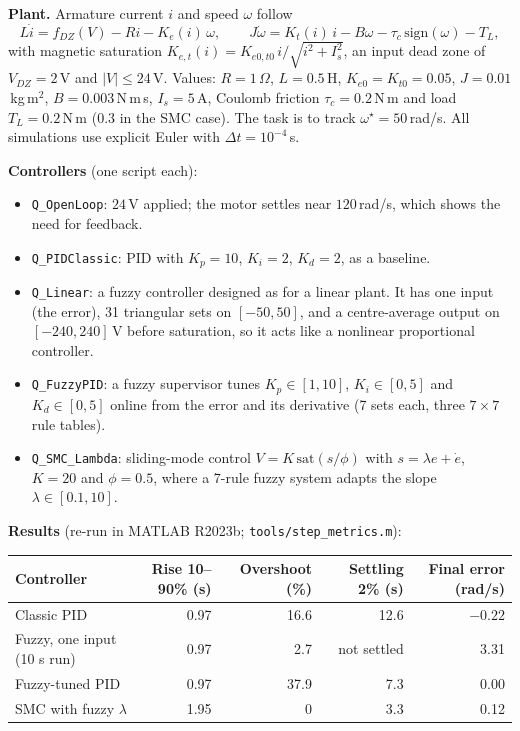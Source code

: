 


\textbf{Plant.} Armature current $i$ and speed $\omega$ follow
\[ L\dot i=f_{DZ}(V)-Ri-K_e(i)\,\omega,\qquad J\dot\omega=K_t(i)\,i-B\omega-\tau_c\,\mathrm{sign}(\omega)-T_L, \]
with magnetic saturation $K_{e,t}(i)=K_{e0,t0}\,i/\sqrt{i^2+I_s^2}$, an input dead zone of $V_{DZ}=2$\,V and $|V|\le24$\,V. Values: $R=1\,\Omega$, $L=0.5$\,H, $K_{e0}=K_{t0}=0.05$, $J=0.01$\,kg\,m$^2$, $B=0.003$\,N\,m\,s, $I_s=5$\,A, Coulomb friction $\tau_c=0.2$\,N\,m and load $T_L=0.2$\,N\,m ($0.3$ in the SMC case). The task is to track $\omega^\star=50$\,rad/s. All simulations use explicit Euler with $\Delta t=10^{-4}$\,s.

\textbf{Controllers} (one script each):
\begin{itemize}
  \item \texttt{Q\_OpenLoop}: $24$\,V applied; the motor settles near $120$\,rad/s, which shows the need for feedback.
  \item \texttt{Q\_PIDClassic}: PID with $K_p=10$, $K_i=2$, $K_d=2$, as a baseline.
  \item \texttt{Q\_Linear}: a fuzzy controller designed as for a linear plant. It has one input (the error), 31 triangular sets on $[-50,50]$, and a centre-average output on $[-240,240]$\,V before saturation, so it acts like a nonlinear proportional controller.
  \item \texttt{Q\_FuzzyPID}: a fuzzy supervisor tunes $K_p\in[1,10]$, $K_i\in[0,5]$ and $K_d\in[0,5]$ online from the error and its derivative (7 sets each, three $7\times7$ rule tables).
  \item \texttt{Q\_SMC\_Lambda}: sliding-mode control $V=K\,\mathrm{sat}(s/\phi)$ with $s=\lambda e+\dot e$, $K=20$ and $\phi=0.5$, where a 7-rule fuzzy system adapts the slope $\lambda\in[0.1,10]$.
\end{itemize}

\textbf{Results} (re-run in MATLAB R2023b; \texttt{tools/step\_metrics.m}):

\begin{center}\begin{tabular}{lrrrr}
\toprule
Controller & Rise 10--90\% (s) & Overshoot (\%) & Settling 2\% (s) & Final error (rad/s) \\
\midrule
Classic PID & 0.97 & 16.6 & 12.6 & $-0.22$ \\
Fuzzy, one input (10 s run) & 0.97 & 2.7 & not settled & 3.31 \\
Fuzzy-tuned PID & 0.97 & 37.9 & 7.3 & $0.00$ \\
SMC with fuzzy $\lambda$ & 1.95 & 0 & 3.3 & 0.12 \\
\bottomrule
\end{tabular}\end{center}

